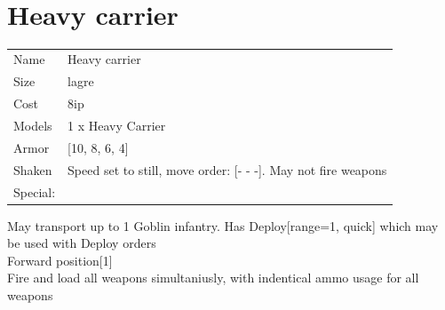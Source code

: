  
\ \\













\clearpage

\section{ Heavy carrier }

\begin{tabular}{ll}
  Name & Heavy carrier \\
  Size & lagre\\
  Cost & 8ip\\
  Models & 1 x Heavy Carrier\\
  Armor & [10, 8, 6, 4]\\
  Shaken & Speed set to still, move order: [- - -]. May not fire weapons\\
  Special: \\
\end{tabular}

\noindent May transport up to 1 Goblin infantry. Has Deploy[range=1, quick] which may be used with Deploy orders\\ 
Forward position[1]\\ 
Fire and load all weapons simultaniusly, with indentical ammo usage for all weapons\\ 


